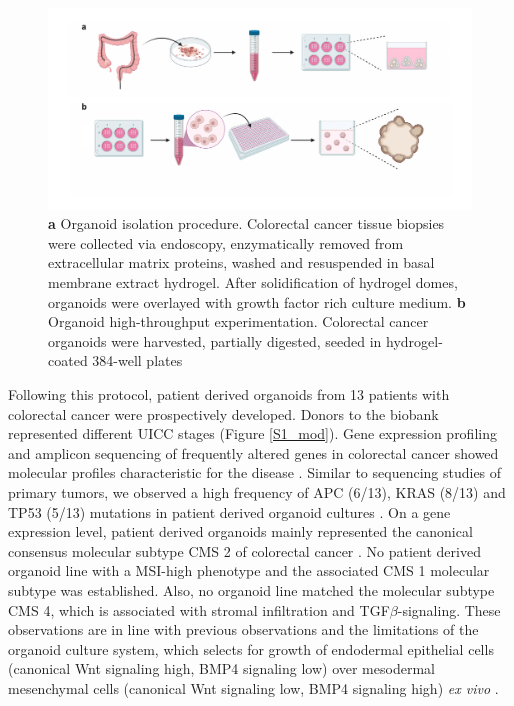 \begin{flushleft}
\begin{figure}[h]
\centering
\includegraphics[width=\textwidth,
                height=\textheight,
                keepaspectratio]{figures/pdf/fig_1_1_0.pdf}
\caption{\textbf{a} Organoid isolation procedure. Colorectal cancer tissue biopsies were collected via endoscopy, enzymatically removed from extracellular matrix proteins, washed and resuspended in basal membrane extract hydrogel. After solidification of hydrogel domes, organoids were overlayed with growth factor rich culture medium. \textbf{b} Organoid high-throughput experimentation. Colorectal cancer organoids were harvested, partially digested, seeded in hydrogel-coated 384-well plates}
\label{fig_1.1.0}
\end{figure}

Following this protocol, patient derived organoids from 13 patients with colorectal cancer were prospectively developed. Donors to the biobank represented different UICC stages (Figure \ref{S1_mod}). Gene expression profiling and amplicon sequencing of frequently altered genes in colorectal cancer showed molecular profiles characteristic for the disease . Similar to sequencing studies of primary tumors, we observed a high frequency of APC (6/13), KRAS (8/13) and TP53 (5/13) mutations in patient derived organoid cultures \cite{Muzny2012-hr}. On a gene expression level, patient derived organoids mainly represented the canonical consensus molecular subtype CMS 2 of colorectal cancer \cite{Guinney2015-ex}. No patient derived organoid line with a MSI-high phenotype and the associated CMS 1 molecular subtype was established. Also, no organoid line matched the molecular subtype CMS 4, which is associated with stromal infiltration and TGF\(\beta\)-signaling. These observations are in line with previous observations \cite{Van_De_Wetering2015-ko, Schutte2017-fl} and the limitations of the organoid culture system, which selects for growth of  endodermal epithelial cells (canonical Wnt signaling high, BMP4 signaling low) over mesodermal mesenchymal cells (canonical Wnt signaling low, BMP4 signaling high) \textit{ex vivo} \cite{Sato2011-lh}.


\end{flushleft}
